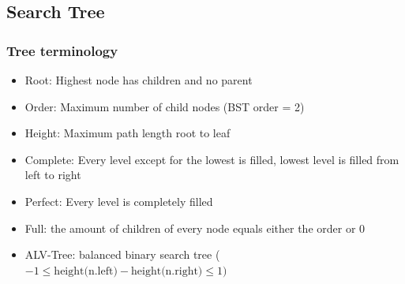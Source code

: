 \subsection{Search Tree}
    \subsubsection{Tree terminology} \label{sec_tree_terminology}
        \begin{itemize}
            \item Root: Highest node has children and no parent
            \item Order: Maximum number of child nodes (BST order = 2)
            \item Height: Maximum path length root to leaf
            \item Complete: Every level except for the lowest is filled, lowest level is filled from left to right
            \item Perfect: Every level is completely filled
            \item Full: the amount of children of every node equals either the order or 0
            \item ALV-Tree: balanced binary search tree ($-1 \leq \text{height(n.left)} - \text{height(n.right)} \leq 1)$
        \end{itemize}
    
